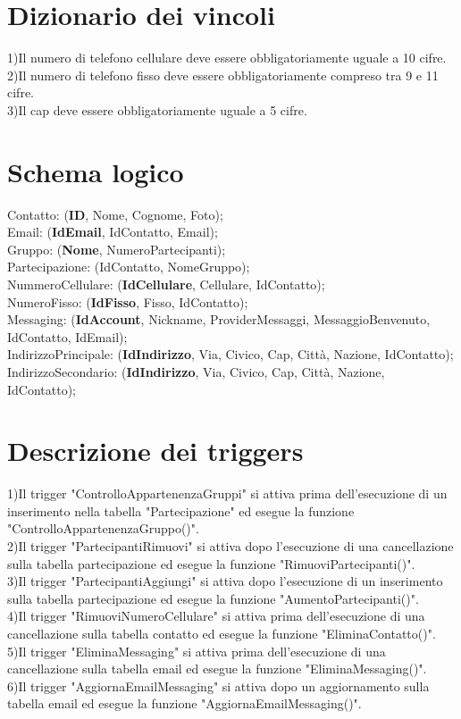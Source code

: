 \documentclass{article}
\begin{document}
    \section{\LARGE Dizionario dei vincoli}
    1)Il numero di telefono cellulare deve essere obbligatoriamente uguale a 10 cifre.\\
    2)Il numero di telefono fisso deve essere  obbligatoriamente compreso tra 9 e 11 cifre.\\
    3)Il cap deve essere obbligatoriamente uguale a 5 cifre.
    \section{\LARGE Schema logico}
    Contatto: (\textbf{ID}, Nome, Cognome, Foto);\\
    Email: (\textbf{IdEmail}, IdContatto, Email);\\
    Gruppo: (\textbf{Nome}, NumeroPartecipanti);\\
    Partecipazione: (IdContatto, NomeGruppo);\\
    NummeroCellulare: (\textbf{IdCellulare}, Cellulare, IdContatto);\\
    NumeroFisso: (\textbf{IdFisso}, Fisso,  IdContatto);\\
    Messaging: (\textbf{IdAccount}, Nickname, ProviderMessaggi, MessaggioBenvenuto, IdContatto, IdEmail);\\
    IndirizzoPrincipale: (\textbf{IdIndirizzo}, Via, Civico, Cap, Città, Nazione, IdContatto);\\
    IndirizzoSecondario: (\textbf{IdIndirizzo}, Via, Civico, Cap, Città, Nazione, IdContatto);

    \newpage
    \section{\LARGE Descrizione dei triggers}
    1)Il trigger "ControlloAppartenenzaGruppi" si attiva prima dell'esecuzione di un 
    inserimento nella tabella "Partecipazione" ed esegue la funzione "ControlloAppartenenzaGruppo()".\\
    2)Il trigger "PartecipantiRimuovi" si attiva dopo l'esecuzione di una cancellazione
    sulla tabella partecipazione ed esegue la funzione "RimuoviPartecipanti()".\\
    3)Il trigger "PartecipantiAggiungi" si attiva dopo l'esecuzione di un inserimento
    sulla tabella partecipazione ed esegue la funzione "AumentoPartecipanti()".\\
    4)Il trigger "RimuoviNumeroCellulare" si attiva prima dell'esecuzione di una cancellazione sulla tabella 
    contatto ed esegue la funzione "EliminaContatto()".\\
    5)Il trigger "EliminaMessaging" si attiva prima dell'esecuzione di una cancellazione sulla tabella email
    ed esegue la funzione "EliminaMessaging()".\\
    6)Il trigger "AggiornaEmailMessaging" si attiva dopo un aggiornamento sulla tabella email ed esegue la funzione
    "AggiornaEmailMessaging()".
\end{document}
